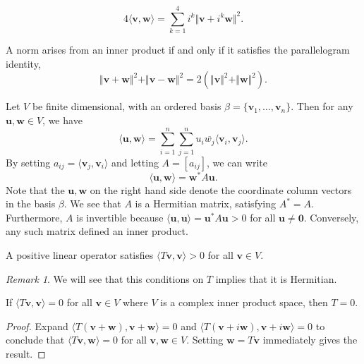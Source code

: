 \documentclass[11pt]{article}
\renewcommand{\vec}[1]{\boldsymbol{#1}}
\newcommand{\vu}{\vec{u}}
\newcommand{\vv}{\vec{v}}
\newcommand{\vw}{\vec{w}}
\newcommand{\ip}[2]{\langle #1, #2 \rangle}
\newcommand{\norm}[1]{\Vert #1 \Vert}
\theoremstyle{definition}
\theoremstyle{remark}
\newtheorem*{remark}{Remark}
\numberwithin{equation}{section}
\begin{document}
    \begin{lemma}
        \[
            4\ip{\vv}{\vw} = \sum_{k = 1}^4 i^k\norm{\vv + i^k\vw}^2.
        \] 
    \end{lemma}

    \begin{lemma}
        A norm arises from an inner product if and only if it satisfies the
        parallelogram identity, \[
            \norm{\vv + \vw}^2 + \norm{\vv - \vw}^2 = 2(\norm{\vv}^2 + \norm{\vw}^2).
        \] 
    \end{lemma}

    \begin{lemma}
        Let $V$ be finite dimensional, with an ordered basis $\beta = \{\vv_1, \dots,
        \vv_n\}$. Then for any $\vu, \vw \in V$, we have \[
            \ip{\vu}{\vw} = \sum_{i = 1}^n \sum_{j = 1}^n u_i\overline{w_j}
            \ip{\vv_i}{\vv_j}.  \] By setting $a_{ij} = \ip{\vv_j}{\vv_i}$ and
            letting $A = [a_{ij}]$, we can
        write \[
            \ip{\vu}{\vw} = \vw^* A \vu.
        \] Note that the $\vu, \vw$ on the right hand side denote the coordinate
        column vectors in the basis $\beta$. We see that $A$ is a Hermitian matrix,
        satisfying $A^* = A$. Furthermore, $A$ is invertible because $\ip{\vu}{\vu} =
        \vu^*A\vu > 0$ for all $\vu \neq \vec{0}$. Conversely, any such matrix
        defined an inner product.
    \end{lemma}

    \begin{definition}
        A positive linear operator satisfies $\ip{T\vv}{\vv} > 0$ for all $\vv \in
        V$.
        \begin{remark}
            We will see that this conditions on $T$ implies that it is Hermitian.
        \end{remark}
    \end{definition}

    \begin{lemma}
        If $\ip{T\vv}{\vv} = 0$ for all $\vv\in V$ where $V$ is a complex inner
        product space, then $T = 0$.
    \end{lemma}
    \begin{proof}
        Expand $\ip{T(\vv + \vw)}{\vv + \vw} = 0$ and $\ip{T(\vv + i\vw)}{\vv + i\vw}
        = 0$ to conclude that $\ip{T\vv}{\vw} = 0$ for all $\vv, \vw \in V$. Setting
        $\vw = T\vv$ immediately gives the result.
    \end{proof}
\end{document}
